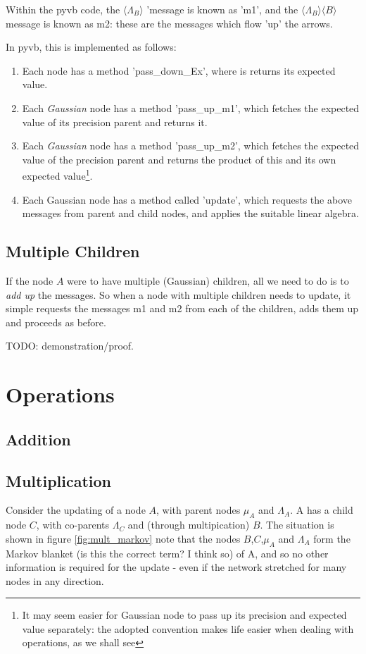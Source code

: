 \documentclass{article}
\newcommand{\<}{\langle}
\renewcommand{\>}{\rangle}
\begin{document}
Within the pyvb code, the $\<\Lambda_B\>$ 'message is known as 'm1', and the $\<\Lambda_B\> \<B\>$ message is known as m2: these are the messages which flow 'up' the arrows. 

In pyvb, this is implemented as follows:
\begin{enumerate}
\item Each node has a method 'pass\_down\_Ex', where is returns its expected value. 
\item Each {\em Gaussian} node has a method 'pass\_up\_m1', which fetches the expected value of its precision parent and returns it.
\item Each {\em Gaussian} node has a method 'pass\_up\_m2', which fetches the expected value of the precision parent and returns the product of this and its own expected value\footnote{It may seem easier for Gaussian node to pass up its precision and expected value separately: the adopted convention makes life easier when dealing with operations, as we shall see}. 
\item Each Gaussian node has a method called 'update', which requests the above messages from parent and child nodes, and applies the suitable linear algebra.
\end{enumerate}

\subsection{Multiple Children}
If the node $A$ were to have multiple (Gaussian) children, all we need to do is to {\em add up} the messages. So when a node with multiple children needs to update, it simple requests the messages m1 and m2 from each of the children, adds them up and proceeds as before.  

TODO: demonstration/proof.  



\section{Operations}
\subsection{Addition}
\subsection{Multiplication}
Consider the updating of a node $A$, with parent nodes $\mu_A$ and $\Lambda_A$.  A has a child node $C$, with co-parents $\Lambda_C$ and (through multipication) $B$.  The situation is shown in figure \ref{fig:mult_markov}
note that the nodes $B$,$C$,$\mu_A$ and $\Lambda_A$ form the Markov blanket (is this the correct term? I think so) of A, and so no other information is required for the update - even if the network stretched for many nodes in any direction.  
\end{document}
